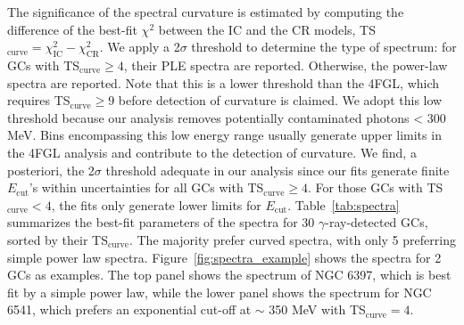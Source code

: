 \documentclass[doublespace,nopageskip]{VTthesis} %
\begin{document}
The significance of the spectral curvature is estimated by computing the difference of the best-fit $\chi^2$ between the IC and the CR models, TS$_\mathrm{curve} = \chi^2_\text{IC} - \chi^2_\text{CR}.$ We apply a 2$\sigma$ threshold to determine the type of spectrum: for GCs with TS$_\mathrm{curve} \ge 4$, their PLE spectra are reported. Otherwise, the power-law spectra are reported. Note that this is a lower threshold than the 4FGL, which requires TS$_\mathrm{curve} \ge 9$ before detection of curvature is claimed. We adopt this low threshold because our analysis removes potentially contaminated photons < 300 MeV. Bins encompassing this low energy range usually generate upper limits in the 4FGL analysis and contribute to the detection of curvature. We find, a posteriori, the 2$\sigma$ threshold adequate in our analysis since our fits generate finite $E_\mathrm{cut}$'s within uncertainties for all GCs with TS$_\mathrm{curve} \ge 4$. For those GCs with TS$_\mathrm{curve} < 4$, the fits only generate lower limits for $E_\mathrm{cut}$. Table~\ref{tab:spectra} summarizes the best-fit parameters of the spectra for 30 $\gamma$-ray-detected GCs, sorted by their TS$_\mathrm{curve}$. The majority prefer curved spectra, with only 5 preferring simple power law spectra. Figure~\ref{fig:spectra_example} shows the spectra for 2 GCs as examples. The top panel shows the spectrum of NGC 6397, which is best fit by a simple power law, while the lower panel shows the spectrum for NGC 6541, which prefers an exponential cut-off at $\sim$ 350 MeV with TS$_\mathrm{curve}=4$. 
\end{document}
